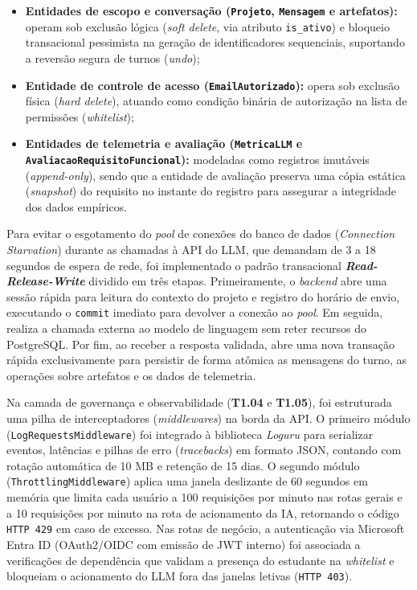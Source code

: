 \begin{itemize}
    \item \textbf{Entidades de escopo e conversação (\texttt{Projeto}, \texttt{Mensagem} e artefatos):} operam sob exclusão lógica (\textit{soft delete}, via atributo \texttt{is\_ativo}) e bloqueio transacional pessimista na geração de identificadores sequenciais, suportando a reversão segura de turnos (\textit{undo});
    \item \textbf{Entidade de controle de acesso (\texttt{EmailAutorizado}):} opera sob exclusão física (\textit{hard delete}), atuando como condição binária de autorização na lista de permissões (\textit{whitelist});
    \item \textbf{Entidades de telemetria e avaliação (\texttt{MetricaLLM} e \texttt{Avaliacao\allowbreak Requisito\allowbreak Funcional}):} modeladas como registros imutáveis (\textit{append-only}), sendo que a entidade de avaliação preserva uma cópia estática (\textit{snapshot}) do requisito no instante do registro para assegurar a integridade dos dados empíricos.
\end{itemize}

Para evitar o esgotamento do \textit{pool} de conexões do banco de dados (\textit{Connection Starvation}) durante as chamadas à API do LLM, que demandam de 3 a 18 segundos de espera de rede, foi implementado o padrão transacional \textbf{\textit{Read-Release-Write}} dividido em três etapas. Primeiramente, o \textit{backend} abre uma sessão rápida para leitura do contexto do projeto e registro do horário de envio, executando o \texttt{commit} imediato para devolver a conexão ao \textit{pool}. Em seguida, realiza a chamada externa ao modelo de linguagem sem reter recursos do PostgreSQL. Por fim, ao receber a resposta validada, abre uma nova transação rápida exclusivamente para persistir de forma atômica as mensagens do turno, as operações sobre artefatos e os dados de telemetria.

Na camada de governança e observabilidade (\textbf{T1.04} e \textbf{T1.05}), foi estruturada uma pilha de interceptadores (\textit{middlewares}) na borda da API. O primeiro módulo (\texttt{LogRequests\allowbreak Middleware}) foi integrado à biblioteca \textit{Loguru} para serializar eventos, latências e pilhas de erro (\textit{tracebacks}) em formato JSON, contando com rotação automática de 10 MB e retenção de 15 dias. O segundo módulo (\texttt{ThrottlingMiddleware}) aplica uma janela deslizante de 60 segundos em memória que limita cada usuário a 100 requisições por minuto nas rotas gerais e a 10 requisições por minuto na rota de acionamento da IA, retornando o código \texttt{HTTP 429} em caso de excesso. Nas rotas de negócio, a autenticação via Microsoft Entra ID (OAuth2/OIDC com emissão de JWT interno) foi associada a verificações de dependência que validam a presença do estudante na \textit{whitelist} e bloqueiam o acionamento do LLM fora das janelas letivas (\texttt{HTTP 403}).

